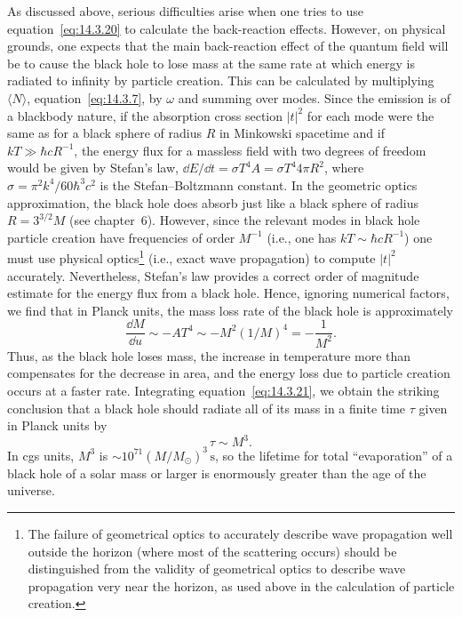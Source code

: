As discussed above, serious difficulties arise when one tries to use
equation~\eqref{eq:14.3.20} to calculate the back-reaction effects. However, on
physical grounds, one expects that the main back-reaction effect of the quantum field
will be to cause the black hole to lose mass at the same rate at which energy is
radiated to infinity by particle creation. This can be calculated by multiplying
\(\langle N\rangle\), equation~\eqref{eq:14.3.7}, by \(\omega\) and summing over
modes. Since the emission is of a blackbody nature, if the absorption cross section
\(|t|^2\) for each mode were the same as for a black sphere of radius \(R\) in
Minkowski spacetime and if \(kT\gg\hbar cR^{-1}\), the energy flux for a massless
field with two degrees of freedom would be given by Stefan's law,
\(\dd E/\dd t=\sigma T^4A=\sigma T^4 4\pi R^2\), where
\(\sigma=\pi^2k^4/60\hbar^3c^2\) is the Stefan--Boltzmann constant. In the
geometric optics approximation, the black hole does absorb just like a black sphere
of radius \(R=3^{3/2}M\) (see chapter~6). However, since the relevant modes in
black hole particle creation have frequencies of order \(M^{-1}\) (i.e., one has
\(kT\sim\hbar cR^{-1}\)) one must use physical optics\footnote{The failure of
geometrical optics to accurately describe wave propagation well outside the horizon
(where most of the scattering occurs) should be distinguished from the validity of
geometrical optics to describe wave propagation very near the horizon, as used
above in the calculation of particle creation.} (i.e., exact wave propagation) to
compute \(|t|^2\) accurately. Nevertheless, Stefan's law provides a correct order of
magnitude estimate for the energy flux from a black hole. Hence, ignoring numerical
factors, we find that in Planck units, the mass loss rate of the black hole is
approximately
\begin{equation}
  \frac{\dd M}{\dd u}\sim-AT^4\sim-M^2(1/M)^4=-\frac1{M^2}.
  \tag{14.3.21}\label{eq:14.3.21}
\end{equation}
Thus, as the black hole loses mass, the increase in temperature more than
compensates for the decrease in area, and the energy loss due to particle creation
occurs at a faster rate. Integrating equation~\eqref{eq:14.3.21}, we obtain the
striking conclusion that a black hole should radiate all of its mass in a finite time
\(\tau\) given in Planck units by
\begin{equation}
  \tau\sim M^3.
  \tag{14.3.22}\label{eq:14.3.22}
\end{equation}
In cgs units, \(M^3\) is \(\sim10^{71}(M/M_\odot)^3\,\mathrm s\), so the lifetime
for total ``evaporation'' of a black hole of a solar mass or larger is enormously
greater than the age of the universe.

